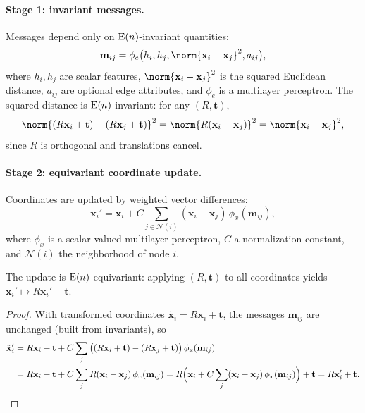 \paragraph{Stage 1: invariant messages.}
Messages depend only on $\operatorname{E}(n)$-invariant quantities:
\begin{equation}
  \mathbf{m}_{ij} = \phi_e\big(h_i, h_j, \norm{\mathbf{x}_i - \mathbf{x}_j}^2,
    a_{ij}\big),
  \label{eq:groups:egnn-message}
\end{equation}
where $h_i, h_j$ are scalar features, $\norm{\mathbf{x}_i - \mathbf{x}_j}^2$ is
the squared Euclidean distance, $a_{ij}$ are optional edge attributes, and
$\phi_e$ is a multilayer perceptron. The squared distance is $\operatorname{E}(n)$-invariant:
for any $(R, \mathbf{t})$,
\begin{equation}
  \norm{(R\mathbf{x}_i + \mathbf{t}) - (R\mathbf{x}_j + \mathbf{t})}^2
  = \norm{R(\mathbf{x}_i - \mathbf{x}_j)}^2
  = \norm{\mathbf{x}_i - \mathbf{x}_j}^2,
\end{equation}
since $R$ is orthogonal and translations cancel.

\paragraph{Stage 2: equivariant coordinate update.}
Coordinates are updated by weighted vector differences:
\begin{equation}
  \mathbf{x}_i' = \mathbf{x}_i + C \sum_{j \in \mathcal{N}(i)}
    (\mathbf{x}_i - \mathbf{x}_j)\, \phi_x(\mathbf{m}_{ij}),
  \label{eq:groups:egnn-coord}
\end{equation}
where $\phi_x$ is a scalar-valued multilayer perceptron, $C$ a normalization
constant, and $\mathcal{N}(i)$ the neighborhood of node $i$.

\begin{proposition}
\label{prop:groups:egnn-equivariance}
The update  is $\operatorname{E}(n)$-equivariant: applying
$(R, \mathbf{t})$ to all coordinates yields $\mathbf{x}_i' \mapsto R\mathbf{x}_i'
+ \mathbf{t}$.
\end{proposition}

\begin{proof}
With transformed coordinates $\tilde{\mathbf{x}}_i = R\mathbf{x}_i + \mathbf{t}$,
the messages $\mathbf{m}_{ij}$ are unchanged (built from invariants), so
\begin{align}
  \tilde{\mathbf{x}}_i'
  &= R\mathbf{x}_i + \mathbf{t} + C \sum_{j} \big((R\mathbf{x}_i + \mathbf{t})
     - (R\mathbf{x}_j + \mathbf{t})\big)\, \phi_x(\mathbf{m}_{ij}) \\
  &= R\mathbf{x}_i + \mathbf{t} + C \sum_{j} R(\mathbf{x}_i - \mathbf{x}_j)\,
     \phi_x(\mathbf{m}_{ij})
   = R\Big(\mathbf{x}_i + C \sum_{j} (\mathbf{x}_i - \mathbf{x}_j)\,
     \phi_x(\mathbf{m}_{ij})\Big) + \mathbf{t}
   = R\mathbf{x}_i' + \mathbf{t}. \qedhere
\end{align}
\end{proof}

